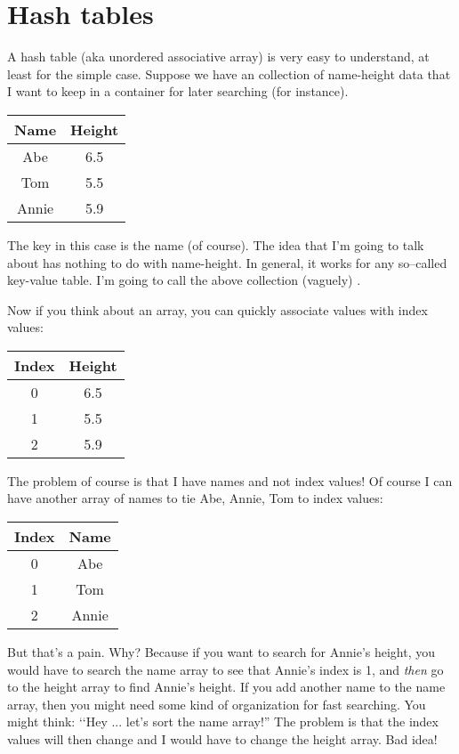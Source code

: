 \section{Hash tables}

A hash table (aka unordered associative array)
is very easy to understand, at least for the simple case.
Suppose we have an collection of name-height data that I want to 
keep in a container for later searching (for instance).
\begin{longtable}{|c|c|}
\hline
Name & Height \\
\hline
Abe &  6.5 \\
Tom &  5.5 \\
Annie &  5.9 \\
\hline
\end{longtable}
The key in this case is the name (of course).
The idea that I'm going to talk about has nothing to do with
name-height.
In general, it works for any so--called key-value table.
I'm going to call the above collection (vaguely) 
.

Now if you think about an array, you can quickly
associate values with index values:
\begin{longtable}{|c|c|}
\hline
Index & Height \\
\hline
0 &  6.5 \\
1 &  5.5 \\
2 &  5.9 \\
\hline
\end{longtable}
The problem of course is that I have names and not index values!
Of course I can have another array of names to tie Abe, Annie, Tom to
index values:
\begin{longtable}{|c|c|}
\hline
Index & Name \\
\hline
0 &  Abe \\
1 &  Tom \\
2 &  Annie \\
\hline
\end{longtable}
But that's a pain.
Why? 
Because if you want to search for Annie's height, you
would have to search the name array to see that Annie's index is 1,
and \textit{then} go to the height array to find Annie's height.
If you add another name to the name array, then you might need
some kind of organization for fast searching.
You might think: \lq\lq Hey ... let's sort the name array!''
The problem is that the index values will then change and I 
would have to change the height array.
Bad idea!

